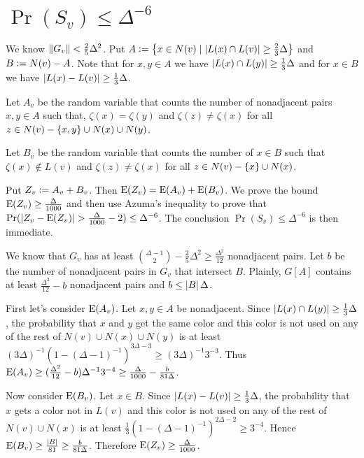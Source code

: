 \section{\texorpdfstring{$\Pr(S_v) \leq \Delta^{-6}$}{The S events}}
We know $\left\Vert G_v\right\Vert < \frac25 \Delta^2$.  Put $A \mathrel{\mathop:}=
\left\{ x \in N(v) \mid \left|L(x) \cap L(v)\right| \geq \frac23 \Delta \right\}$ and $B \mathrel{\mathop:}=
N(v) - A$.  Note that for $x, y \in A$ we have $\left|L(x) \cap L(y)\right| \geq
\frac13 \Delta$ and for $x \in B$ we have $\left|L(x) - L(v)\right| \geq \frac13
\Delta$.

Let $A_v$ be the random variable that counts the number of nonadjacent pairs
$x, y \in A$ such that, $\zeta(x) = \zeta(y)$ and $\zeta(z) \neq \zeta(x)$ for
all $z \in N(v) - \left\{ x, y \right\} \cup N(x) \cup N(y)$.

Let $B_v$ be the random variable that counts the number of $x \in B$ such that
$\zeta(x) \not \in L(v)$ and $\zeta(z) \neq \zeta(x)$ for all $z \in N(v) -
\left\{ x \right\} \cup N(x)$.

Put $Z_v \mathrel{\mathop:}= A_v + B_v$.  Then $\operatorname{E}(Z_v) = \operatorname{E}(A_v) + \operatorname{E}(B_v)$.  We
prove the bound $\operatorname{E}(Z_v) \geq \frac{\Delta}{1000}$ and then use Azuma's
inequality to prove that $\Pr(\left|Z_v - \operatorname{E}(Z_v)\right| > \frac{\Delta}{1000} - 2)
\leq \Delta^{-6}$. The conclusion $\Pr(S_v) \leq \Delta^{-6}$ is then immediate.

We know that $G_v$ has at least $\binom{\Delta - 1}{2} - \frac25 \Delta^2 \geq
\frac{\Delta^2}{12}$ nonadjacent pairs.  Let $b$ be the number of nonadjacent pairs in $G_v$ that intersect $B$. 
Plainly, $G[A]$ contains at least $\frac{\Delta^2}{12} - b$ nonadjacent pairs
and $b \leq \left|B\right|\Delta$.

First let's consider $\operatorname{E}(A_v)$.  Let $x, y \in A$ be nonadjacent.  Since $\left|L(x) \cap L(y)\right| \geq
\frac13 \Delta$, the probability that $x$ and $y$ get the same color and this
color is not used on any of the rest of $N(v) \cup N(x) \cup N(y)$ is at least
$(3\Delta)^{-1} (1-(\Delta-1)^{-1})^{3\Delta - 3} \geq (3\Delta)^{-1}3^{-3}$. 
Thus $\operatorname{E}(A_v) \geq (\frac{\Delta^2}{12} - b)\Delta^{-1}3^{-4} \geq
\frac{\Delta}{1000} - \frac{b}{81\Delta}$.

Now consider $\operatorname{E}(B_v)$.  Let $x \in B$.  Since $\left|L(x) - L(v)\right| \geq \frac13
\Delta$, the probability that $x$ gets a color not in $L(v)$ and this color is
not used on any of the rest of $N(v) \cup N(x)$ is at least $\frac13
(1-(\Delta-1)^{-1})^{2\Delta - 2} \geq 3^{-4}$.  Hence $\operatorname{E}(B_v) \geq
\frac{\left|B\right|}{81} \geq \frac{b}{81\Delta}$.  Therefore $\operatorname{E}(Z_v) \geq
\frac{\Delta}{1000}$.


